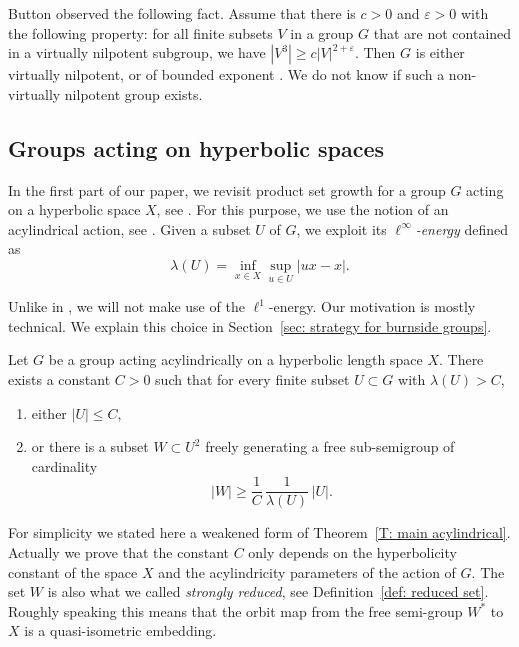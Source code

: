 Button observed the following fact.
Assume that there is $c>0$ and $\varepsilon>0$ with the following property: for all finite subsets $V$ in a group $G$ that are not contained in a virtually nilpotent subgroup, we have $|V^3|\geqslant c |V|^{2+\varepsilon}$.
Then $G$ is either virtually nilpotent, or of bounded exponent \cite[Prop.\,4.1]{button_explicit_2013}.
We do not know if such a non-virtually nilpotent group exists.

\subsection{Groups acting on hyperbolic spaces}
In the first part of our paper, we revisit product set growth for a group $G$ acting on a hyperbolic space $X$, see \cite[Th.\,1.14]{delzant_product_2020}. For this purpose, we use the notion of an acylindrical action, see \cite{sela_acylindricity_1997,bowditch_tight_2008}.
Given a subset $U$ of $G$, we exploit its \emph{$\ell^\infty$-energy} defined as
\begin{equation*}
\lambda(U) = \inf_{x \in X}\sup_{u \in U} |ux - x|.
\end{equation*}

\begin{rem}
Unlike in \cite{delzant_product_2020}, we will not make use of the $\ell^1$-energy.
Our motivation is mostly technical.
We explain this choice in Section~\ref{sec: strategy for burnside groups}.
\end{rem}

\begin{thm}
\label{T: main acylindrical - intro}
Let $G$ be a group acting acylindrically on a hyperbolic length space $X$.
There exists a constant $C > 0$ such that for every finite subset $U\subset G$ with $\lambda(U)> C$,
\begin{enumerate}
\item either $\displaystyle |U| \leq C$,
\item or there is a subset $W\subset U^2$ freely generating a free sub-semigroup of cardinality
\begin{equation*}
|W| \geq \frac 1C\,\frac 1{\lambda(U)}\, |U|.
\end{equation*}
\end{enumerate}
\end{thm}

\begin{rem}
For simplicity we stated here a weakened form of Theorem~\ref{T: main acylindrical}.
Actually we prove that the constant $C$ only depends on the hyperbolicity constant of the space $X$ and the acylindricity parameters of the action of $G$.
The set $W$ is also what we called \emph{strongly reduced}, see Definition~\ref{def: reduced set}.
Roughly speaking this means that the orbit map from the free semi-group $W^*$ to $X$ is a quasi-isometric embedding.
\end{rem}

